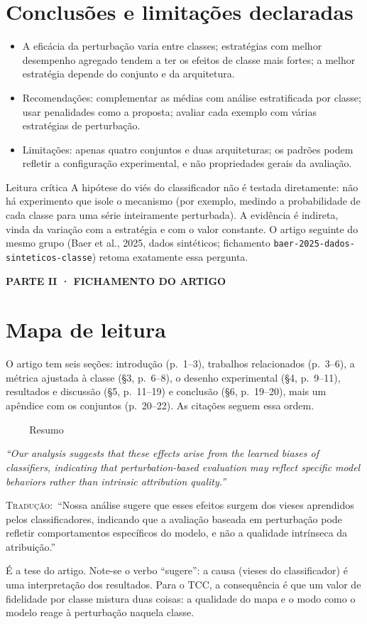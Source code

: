 \documentclass[11pt,a4paper]{article}
\newcommand{\pagechip}[1]{{\setlength{\fboxsep}{1.5pt}\colorbox{cAcc}{\textcolor{white}{\scriptsize\texttt{#1}}}}}
\newcommand{\partbar}[1]{\par\vspace{1.2em}\noindent\colorbox{black!80}{\parbox{\dimexpr\linewidth-2\fboxsep}{\color{white}\bfseries\sffamily\MakeUppercase{#1}}}\par\vspace{0.4em}}
\newenvironment{origquote}{\par\itshape\small}{\par}
\newenvironment{tradquote}{\par\small\textsc{Tradução:}\ }{\par}
\newcommand{\explab}[1]{\par\smallskip{\small\color{cAcc}\textbf{\MakeUppercase{#1}}}\par}
\begin{document}
\section{Conclusões e limitações declaradas}
\begin{itemize}
\item A eficácia da perturbação varia entre classes; estratégias com melhor desempenho agregado tendem a ter os efeitos de classe mais fortes; a melhor estratégia depende do conjunto e da arquitetura.
\item Recomendações: complementar as médias com análise estratificada por classe; usar penalidades como a proposta; avaliar cada exemplo com várias estratégias de perturbação.
\item Limitações: apenas quatro conjuntos e duas arquiteturas; os padrões podem refletir a configuração experimental, e não propriedades gerais da avaliação.
\end{itemize}
\begin{infobox}[warn]{Leitura crítica}
A hipótese do viés do classificador não é testada diretamente: não há experimento que isole o mecanismo (por exemplo, medindo a probabilidade de cada classe para uma série inteiramente perturbada). A evidência é indireta, vinda da variação com a estratégia e com o valor constante. O artigo seguinte do mesmo grupo (Baer et al., 2025, dados sintéticos; fichamento \texttt{baer-2025-dados-sinteticos-classe}) retoma exatamente essa pergunta.
\end{infobox}

\partbar{Parte II · Fichamento do artigo}

\section{Mapa de leitura}
O artigo tem seis seções: introdução (p.~1--3), trabalhos relacionados (p.~3--6), a métrica ajustada à classe (§3, p.~6--8), o desenho experimental (§4, p.~9--11), resultados e discussão (§5, p.~11--19) e conclusão (§6, p.~19--20), mais um apêndice com os conjuntos (p.~20--22). As citações seguem essa ordem.

\begin{citacard}{\pagechip{p. 1} Resumo}
\begin{origquote}“Our analysis suggests that these effects arise from the learned biases of classifiers, indicating that perturbation-based evaluation may reflect specific model behaviors rather than intrinsic attribution quality.”\end{origquote}
\begin{tradquote}“Nossa análise sugere que esses efeitos surgem dos vieses aprendidos pelos classificadores, indicando que a avaliação baseada em perturbação pode refletir comportamentos específicos do modelo, e não a qualidade intrínseca da atribuição.”\end{tradquote}
\explab{Explicação}
É a tese do artigo. Note-se o verbo “sugere”: a causa (vieses do classificador) é uma interpretação dos resultados. Para o TCC, a consequência é que um valor de fidelidade por classe mistura duas coisas: a qualidade do mapa e o modo como o modelo reage à perturbação naquela classe.
\end{citacard}
\end{document}
